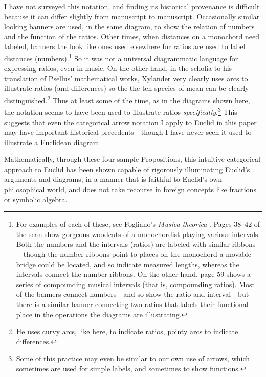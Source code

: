 \documentclass[11pt]{article}
\begin{document}
I have not surveyed this notation, and finding its historical provenance is difficult because it can differ slightly from manuscript to manuscript. Occasionally similar looking banners are used, in the same diagram, to show the relation of numbers and the function of the ratios. Other times, when distances on a monochord need labeled, banners the look like ones used elsewhere for ratios are used to label distances (numbers).\footnote{For examples of each of these, see Fogliano's \textit{Musica theorica} \protect\citep{fogliano1529musica}. Pages 38--42 of the scan show gorgeous woodcuts of a monochordist playing various intervals. Both the numbers and the intervals (ratios) are labeled with similar ribbons---though the number ribbons point to places on the monochord a movable bridge could be located, and so indicate measured lengths, whereas the intervals connect the number ribbons. On the other hand, page 59 shows a series of compounding musical intervals (that is, compounding ratios). Most of the banners connect numbers---and so show the ratio and interval---but there is a similar banner connecting two ratios that labels their functional place in the operations the diagrams are illustrating.} So it was not a universal diagrammatic language for expressing ratios, even in music. On the other hand, in the scholia to his translation of Psellus' mathematical works, Xylander \citep{psellos1556liber} very clearly uses arcs to illustrate ratios (and differences) so the the ten species of mean can be clearly distinguished.\footnote{He uses curvy arcs, like here, to indicate ratios, pointy arcs to indicate differences.} Thus at least some of the time, as in the diagrams shown here, the notation seems to have been used to illustrate ratios \textit{specifically}.\footnote{Some of this practice may even be similar to our own use of arrows, which sometimes are used for simple labels, and sometimes to show functions.} This suggests that even the categorical arrow notation I apply to Euclid in this paper may have important historical precedents---though I have never seen it used to illustrate a Euclidean diagram.

Mathematically, through these four sample Propositions, this intuitive categorical approach to Euclid has been shown capable of rigorously illuminating Euclid's arguments and diagrams, in a manner that is faithful to Euclid's own philosophical world, and does not take recourse in foreign concepts like fractions or symbolic algebra.
\end{document}
